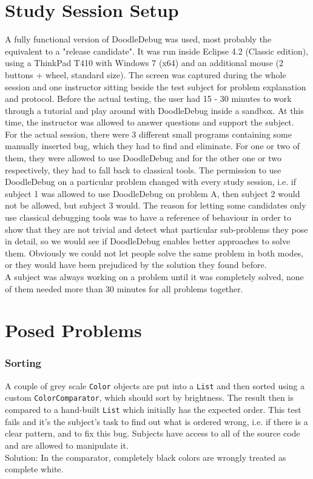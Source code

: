 \documentclass[a4paper,ngerman,english]{amsbook} %
\begin{document}
\section{Study Session Setup}
A fully functional version of DoodleDebug was used, most probably the equivalent to a "release candidate". It was run inside Eclipse 4.2 (Classic edition), using a ThinkPad T410 with Windows 7 (x64) and an additional mouse (2 buttons + wheel, standard size). The screen was captured during the whole session and one instructor sitting beside the test subject for problem explanation and protocol. Before the actual testing, the user had 15 - 30 minutes to work through a tutorial and play around with DoodleDebug inside a sandbox. At this time, the instructor was allowed to answer questions and support the subject.\\
For the actual session, there were 3 different small programs containing some manually inserted bug, which they had to find and eliminate. For one or two of them, they were allowed to use DoodleDebug and for the other one or two respectively, they had to fall back to classical tools. The permission to use DoodleDebug on a particular problem changed with every study session, i.e. if subject 1 was allowed to use DoodleDebug on problem A, then subject 2 would not be allowed, but subject 3 would. The reason for letting some candidates only use classical debugging tools was to have a reference of behaviour in order to show that they are not trivial and detect what particular sub-problems they pose in detail, so we would see if DoodleDebug enables better approaches to solve them. Obviously we could not let people solve the same problem in both modes, or they would have been prejudiced by the solution they found before.\\
A subject was always working on a problem until it was completely solved, none of them needed more than 30 minutes for all problems together.

\section{Posed Problems}
\subsubsection{Sorting}
A couple of grey scale \verb.Color. objects are put into a \verb.List. and then sorted using a custom \verb.ColorComparator., which should sort by brightness. The result then is compared to a hand-built \verb.List. which initially has the expected order. This test fails and it's the subject's task to find out what is ordered wrong, i.e. if there is a clear pattern, and to fix this bug. Subjects have access to all of the source code and are allowed to manipulate it.\\
Solution: In the comparator, completely black colors are wrongly treated as complete white.
\end{document}
